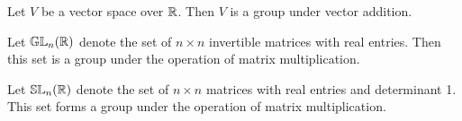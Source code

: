 \documentclass[./main.tex]{subfiles}
\begin{document}
\begin{example}
    Let $V$ be a vector space over $\mathbb{R}$. Then $V$ is a group under vector
    addition.
\end{example}

\begin{example}
    Let $\mathbb{GL}_n(\mathbb{R})$ denote the set of $n \times n$ invertible matrices
    with real entries. Then this set is a group under the operation of matrix
    multiplication.
\end{example}

\begin{example}
    Let $\mathbb{SL}_n(\mathbb{R})$ denote the set of $n \times n$ matrices with real
    entries and determinant 1. This set forms a group under the operation of
    matrix multiplication.
\end{example}
\end{document}
